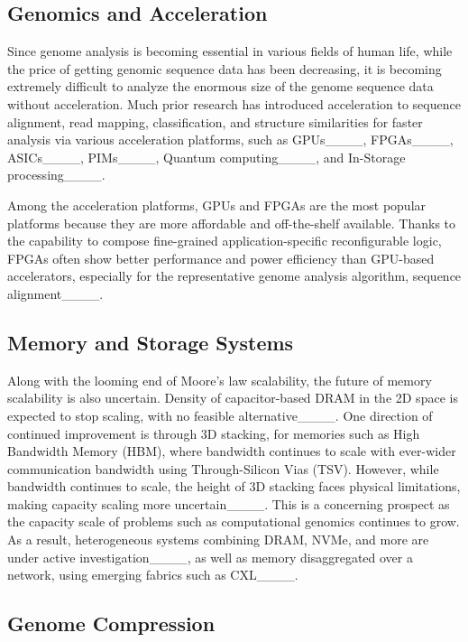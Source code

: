\subsection{Genomics and Acceleration}

Since genome analysis is becoming essential in various fields of human life, while the price of getting genomic sequence data has been decreasing, it is becoming extremely difficult to analyze the enormous size of the genome sequence data without acceleration.
Much prior research has introduced acceleration to sequence alignment, read mapping, classification, and structure similarities for faster analysis via various acceleration platforms, such as GPUs____, FPGAs____, ASICs____, PIMs____, Quantum computing____, and In-Storage processing____.

Among the acceleration platforms, GPUs and FPGAs are the most popular platforms because they are more affordable and off-the-shelf available.
Thanks to the capability to compose fine-grained application-specific reconfigurable logic, FPGAs often show better performance and power efficiency than GPU-based accelerators, especially for the representative genome analysis algorithm, sequence alignment____. 


\subsection{Memory and Storage Systems}

Along with the looming end of Moore's law scalability, the future of memory scalability is also uncertain.
Density of capacitor-based DRAM in the 2D space is expected to stop scaling, with no feasible alternative____.
One direction of continued improvement is through 3D stacking, for memories such as High Bandwidth Memory (HBM), where bandwidth continues to scale with ever-wider communication bandwidth using Through-Silicon Vias (TSV).
However, while bandwidth continues to scale, the height of 3D stacking faces physical limitations, making capacity scaling more uncertain____.
This is a concerning prospect as the capacity scale of problems such as computational genomics continues to grow.
As a result, heterogeneous systems combining DRAM, NVMe, and more are under active investigation____, as well as memory disaggregated over a network, using emerging fabrics such as CXL____.


\subsection{Genome Compression}

